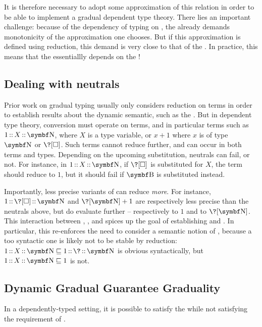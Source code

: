 It is therefore necessary to adopt some approximation of this relation
in order to be able to implement a gradual dependent type theory.
There lies an important challenge: because of the dependency of typing on ,
the  already demands monotonicity of the approximation
one chooses. But if this approximation is defined using reduction, this demand is
very close to that of the .%
In practice, this means that the  essentiallly depends on the !

\subsection{Dealing with neutrals}
Prior work on gradual typing usually only considers reduction on  terms in order to establish results about the dynamic semantic, such as the .
%
But in dependent type theory, conversion must operate on  terms,
and in particular  terms such as $\asc{\asc{1}{X}}{\Nat}$,
where $X$ is a type variable, or $x + 1$ where $x$ is of type $\Nat$ or $\?[\uni]$.
%
Such  terms cannot reduce further, and can occur in both terms and types.
Depending on the upcoming substitution, neutrals can fail, or not. For instance, in $\asc{\asc{1}{X}}{\Nat}$, if $\?[\uni]$ is substituted for $X$, the term should reduce to $1$,
but it should fail if $\Bool$ is substituted instead.

Importantly, less precise variants of  can reduce \emph{more}.
For instance, $\asc{\asc{1}{\?[\uni]}}{\Nat}$ and $\?[\Nat] + 1$ are respectively
less precise than the neutrals above, but do evaluate further – respectively to $1$
and to $\?[\Nat]$. This interaction between , , and 
spices up the goal of establishing  and .
In particular, this re-enforces the need to consider a semantic notion of ,
because a too syntactic one is likely not to be stable by reduction:
$\asc{\asc{1}{X}}{\Nat} \pre \asc{\asc{1}{\?}}{\Nat}$ is obvious syntactically,
but $\asc{\asc{1}{X}}{\Nat} \pre 1$ is not.

\subsection{Dynamic Gradual Guarantee \vs Graduality}
In a dependently-typed setting, it is possible to satisfy the  while not satisfying the  requirement of .

